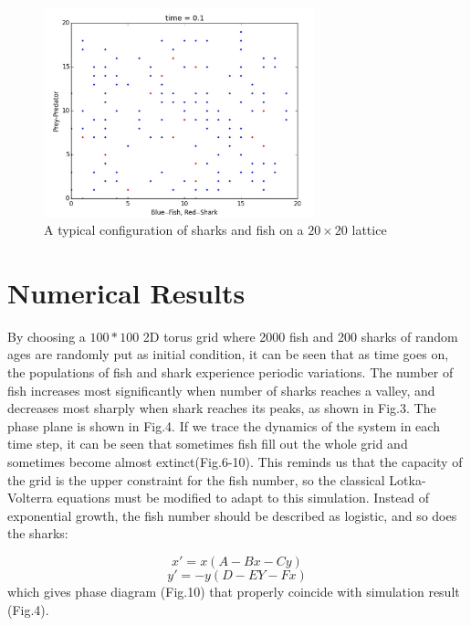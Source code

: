 \documentclass[aps,prl,preprint,superscriptaddress]{revtex4}
\begin{document}
\begin{figure}[H]
	\centering
	\includegraphics[width = 0.7\textwidth]{example}
	\caption{A typical configuration of sharks and fish on a $20 \times 20$ lattice}
	\label{ex} 
\end{figure}


\section{Numerical Results}

By choosing a $100*100$ 2D torus grid where 2000 fish and 200 sharks of random ages are randomly put as initial condition, it can be seen that as time goes on, the populations of fish and shark experience periodic variations. The number of fish increases most significantly when number of sharks reaches a valley, and decreases most sharply when shark reaches its peaks, as shown in Fig.3. The phase plane is shown in Fig.4. If we trace the dynamics of the system in each time step, it can be seen that sometimes fish fill out the whole grid and sometimes become almost extinct(Fig.6-10). This reminds us that the capacity of the grid is the upper constraint for the fish number, so the classical Lotka-Volterra equations must be modified to adapt to this simulation. Instead of exponential growth, the fish number should be described as logistic, and so does the sharks:

\begin{equation}
x' = x(A - Bx - Cy)
\end{equation}
\begin{equation}
y' = -y(D - EY -Fx)
\end{equation}
which gives phase diagram (Fig.10) that properly coincide with simulation result (Fig.4).
\end{document}
